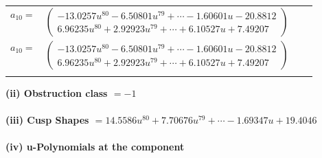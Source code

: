\documentclass[1p]{elsarticle_modified}
\theoremstyle{definition}
\begin{document}
\begin{tabular}{m{7pt} m{180pt} m{7pt} m{180pt} }
\flushright $a_{10}=$&$\begin{pmatrix}-13.0257 u^{80}-6.50801 u^{79}+\cdots-1.60601 u-20.8812\\6.96235 u^{80}+2.92923 u^{79}+\cdots+6.10527 u+7.49207\end{pmatrix}$\\ \flushright $a_{10}=$&$\begin{pmatrix}-13.0257 u^{80}-6.50801 u^{79}+\cdots-1.60601 u-20.8812\\6.96235 u^{80}+2.92923 u^{79}+\cdots+6.10527 u+7.49207\end{pmatrix}$\\&\end{tabular}
\flushleft \textbf{(ii) Obstruction class $= -1$}\\~\\
\flushleft \textbf{(iii) Cusp Shapes $= 14.5586 u^{80}+7.70676 u^{79}+\cdots-1.69347 u+19.4046$}\\~\\
\newpage\renewcommand{\arraystretch}{1}
\flushleft \textbf{(iv) u-Polynomials at the component}\newline \\
\end{document}
